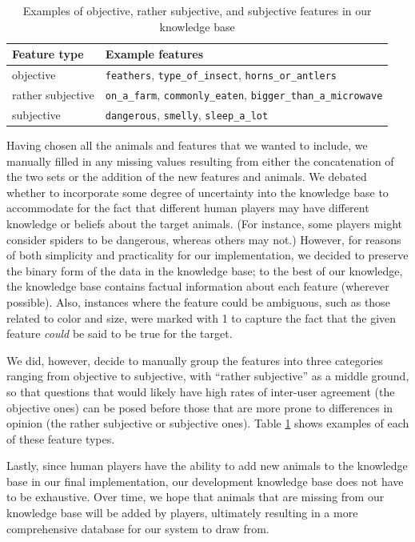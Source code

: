 \documentclass[11pt,a4paper]{article}
\begin{document}
\begin{table}
    \centering
    \begin{tabular}{ll}
    \toprule
    Feature type & Example features \\ 
    \midrule
         objective &  \texttt{feathers}, \texttt{type\_of\_insect}, \texttt{horns\_or\_antlers} \\
         rather subjective & \texttt{on\_a\_farm}, \texttt{commonly\_eaten}, \texttt{bigger\_than\_a\_microwave} \\
         subjective & \texttt{dangerous}, \texttt{smelly}, \texttt{sleep\_a\_lot}\\
    \bottomrule
    \end{tabular}
    \caption{Examples of objective, rather subjective, and subjective features in our knowledge base}
    \label{tab:feature-types}
\end{table}

Having chosen all the animals and features that we wanted to include, we manually filled in any missing values resulting from either the concatenation of the two sets or the addition of the new features and animals. 
We debated whether to incorporate some degree of uncertainty into the knowledge base to accommodate for the fact that different human players may have different knowledge or beliefs about the target animals. 
(For instance, some players might consider spiders to be dangerous, whereas others may not.) 
However, for reasons of both simplicity and practicality for our implementation, we decided to preserve the binary form of the data in the knowledge base; to the best of our knowledge, the knowledge base contains factual information about each feature (wherever possible). 
Also, instances where the feature could be ambiguous, such as those related to color and size, were marked with 1 to capture the fact that the given feature \textit{could} be said to be true for the target.

We did, however, decide to manually group the features into three categories ranging from objective to subjective, with ``rather subjective'' as a middle ground, so that questions that would likely have high rates of inter-user agreement (the objective ones) can be posed before those that are more prone to differences in opinion (the rather subjective or subjective ones). 
Table \ref{tab:feature-types} shows examples of each of these feature types.

Lastly, since human players have the ability to add new animals to the knowledge base in our final implementation, our development knowledge base does not have to be exhaustive. 
Over time, we hope that animals that are missing from our knowledge base will be added by players, ultimately resulting in a more comprehensive database for our system to draw from.
\end{document}
